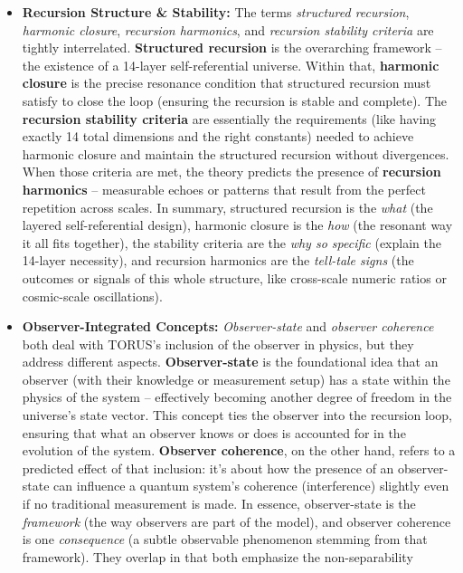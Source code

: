 \begin{itemize}
\item
  \textbf{Recursion Structure \& Stability:} The terms \emph{structured
  recursion}, \emph{harmonic closure}, \emph{recursion harmonics}, and
  \emph{recursion stability criteria} are tightly interrelated.
  \textbf{Structured recursion} is the overarching framework -- the
  existence of a 14-layer self-referential universe. Within that,
  \textbf{harmonic closure} is the precise resonance condition that
  structured recursion must satisfy to close the loop (ensuring the
  recursion is stable and complete). The \textbf{recursion stability
  criteria} are essentially the requirements (like having exactly 14
  total dimensions and the right constants) needed to achieve harmonic
  closure and maintain the structured recursion without divergences​.
  When those criteria are met, the theory predicts the presence of
  \textbf{recursion harmonics} -- measurable echoes or patterns that
  result from the perfect repetition across scales. In summary,
  structured recursion is the \emph{what} (the layered self-referential
  design), harmonic closure is the \emph{how} (the resonant way it all
  fits together), the stability criteria are the \emph{why so specific}
  (explain the 14-layer necessity), and recursion harmonics are the
  \emph{tell-tale signs} (the outcomes or signals of this whole
  structure, like cross-scale numeric ratios or cosmic-scale
  oscillations).
\item
  \textbf{Observer-Integrated Concepts:} \emph{Observer-state} and
  \emph{observer coherence} both deal with TORUS's inclusion of the
  observer in physics, but they address different aspects.
  \textbf{Observer-state} is the foundational idea that an observer
  (with their knowledge or measurement setup) has a state within the
  physics of the system -- effectively becoming another degree of
  freedom in the universe's state vector​. This concept ties the
  observer into the recursion loop, ensuring that what an observer knows
  or does is accounted for in the evolution of the system.
  \textbf{Observer coherence}, on the other hand, refers to a predicted
  effect of that inclusion: it's about how the presence of an
  observer-state can influence a quantum system's coherence
  (interference) slightly even if no traditional measurement is made​.
  In essence, observer-state is the \emph{framework} (the way observers
  are part of the model), and observer coherence is one
  \emph{consequence} (a subtle observable phenomenon stemming from that
  framework). They overlap in that both emphasize the non-separability

\end{itemize}
